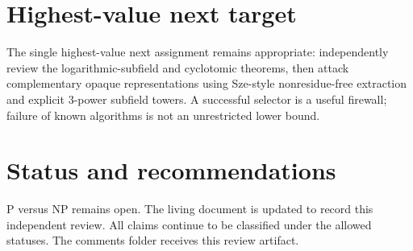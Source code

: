 \documentclass[11pt]{article}
\begin{document}
\section{Highest-value next target}
The single highest-value next assignment remains appropriate: independently review the logarithmic-subfield and cyclotomic theorems, then attack complementary opaque representations using Sze-style nonresidue-free extraction and explicit $3$-power subfield towers. A successful selector is a useful firewall; failure of known algorithms is not an unrestricted lower bound.

\section{Status and recommendations}
P versus NP remains open. The living document is updated to record this independent review. All claims continue to be classified under the allowed statuses. The comments folder receives this review artifact.

\end{document}
